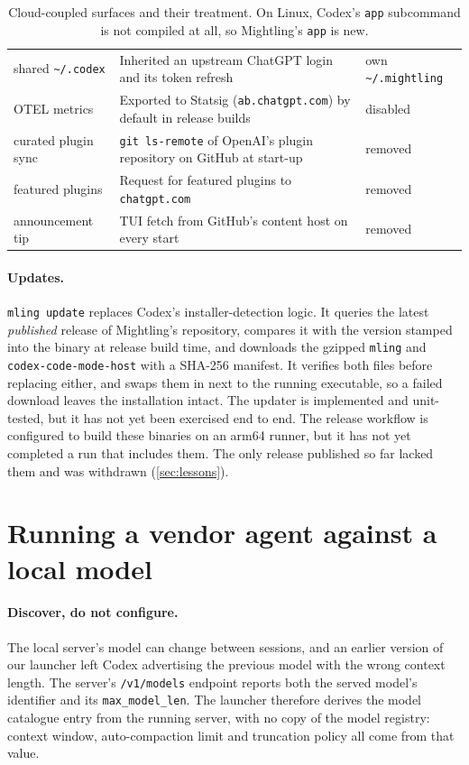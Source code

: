 \documentclass[11pt]{article}
\newcommand{\code}[1]{\texttt{#1}}
\begin{document}
\begin{table}[t]
\begin{tabularx}{\linewidth}{@{}l X l@{}}
shared \code{\textasciitilde/.codex} & Inherited an upstream ChatGPT login and its token refresh & own \code{\textasciitilde/.mightling} \\
OTEL metrics & Exported to Statsig (\code{ab.chatgpt.com}) by default in release builds & disabled \\
curated plugin sync & \code{git ls-remote} of OpenAI's plugin repository on GitHub at start-up & removed \\
featured plugins & Request for featured plugins to \code{chatgpt.com} & removed \\
announcement tip & TUI fetch from GitHub's content host on every start & removed \\
\bottomrule
\end{tabularx}
\caption{Cloud-coupled surfaces and their treatment. On Linux, Codex's \code{app} subcommand is
not compiled at all, so Mightling's \code{app} is new.}
\label{tab:cloud}
\end{table}

\paragraph{Updates.} \code{mling update} replaces Codex's installer-detection logic. It queries the
latest \emph{published} release of Mightling's repository, compares it with the version stamped into
the binary at release build time, and downloads the gzipped \code{mling} and
\code{codex-code-mode-host} with a SHA-256 manifest. It verifies both files before replacing either,
and swaps them in next to the running executable, so a failed download leaves the installation
intact. The updater is implemented and unit-tested, but it has not yet been exercised end to end.
The release workflow is configured to build these binaries on an arm64 runner, but it has not yet
completed a run that includes them. The only release published so far lacked them and was
withdrawn (\cref{sec:lessons}).

\section{Running a vendor agent against a local model}
\label{sec:local}

\paragraph{Discover, do not configure.} The local server's model can change between sessions, and
an earlier version of our launcher left Codex advertising the previous model with the wrong context
length. The server's \code{/v1/models} endpoint reports both the served model's identifier and its
\code{max\_model\_len}. The launcher therefore derives the model catalogue entry from the running
server, with no copy of the model registry: context window, auto-compaction limit and truncation
policy all come from that value.
\end{document}
